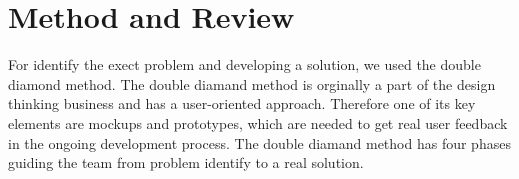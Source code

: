 \documentclass{article}
\begin{document}








\section{Method and Review}
For identify the exect problem and developing a solution, we used the double diamond method. The double diamand method is orginally a part of the design thinking business and has a user-oriented approach. Therefore one of its key elements are mockups and prototypes, which are needed to get real user feedback in the ongoing development process.
The double diamand method has four phases guiding the team from problem identify to a real solution.
\end{document}
